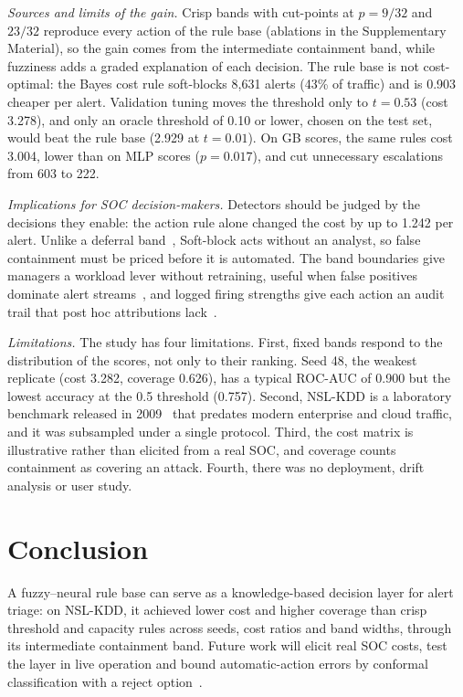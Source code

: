 \documentclass[preprint,12pt]{elsarticle}
\begin{document}
\textit{Sources and limits of the gain.} Crisp bands with cut-points at $p=9/32$ and $23/32$ reproduce every action of the rule base (ablations in the Supplementary Material), so the gain comes from the intermediate containment band, while fuzziness adds a graded explanation of each decision. The rule base is not cost-optimal: the Bayes cost rule soft-blocks 8,631 alerts (43\% of traffic) and is 0.903 cheaper per alert. Validation tuning moves the threshold only to $t=0.53$ (cost 3.278), and only an oracle threshold of 0.10 or lower, chosen on the test set, would beat the rule base (2.929 at $t=0.01$). On GB scores, the same rules cost 3.004, lower than on MLP scores ($p=0.017$), and cut unnecessary escalations from 603 to 222.

\textit{Implications for SOC decision-makers.} Detectors should be judged by the decisions they enable: the action rule alone changed the cost by up to 1.242 per alert. Unlike a deferral band~\cite{jalalvand2027}, Soft-block acts without an analyst, so false containment must be priced before it is automated. The band boundaries give managers a workload lever without retraining, useful when false positives dominate alert streams~\cite{albasheer2022}, and logged firing strengths give each action an audit trail that post hoc attributions lack~\cite{wang2020xai,alabbadi2025}.

\textit{Limitations.} The study has four limitations. First, fixed bands respond to the distribution of the scores, not only to their ranking. Seed 48, the weakest replicate (cost 3.282, coverage 0.626), has a typical ROC-AUC of 0.900 but the lowest accuracy at the 0.5 threshold (0.757). Second, NSL-KDD is a laboratory benchmark released in 2009~\cite{tavallaee2009} that predates modern enterprise and cloud traffic, and it was subsampled under a single protocol. Third, the cost matrix is illustrative rather than elicited from a real SOC, and coverage counts containment as covering an attack. Fourth, there was no deployment, drift analysis or user study.

\section{Conclusion}
\label{sec:concl}
A fuzzy--neural rule base can serve as a knowledge-based decision layer for alert triage: on NSL-KDD, it achieved lower cost and higher coverage than crisp threshold and capacity rules across seeds, cost ratios and band widths, through its intermediate containment band. Future work will elicit real SOC costs, test the layer in live operation and bound automatic-action errors by conformal classification with a reject option~\cite{szabadvary2025}.
\end{document}

